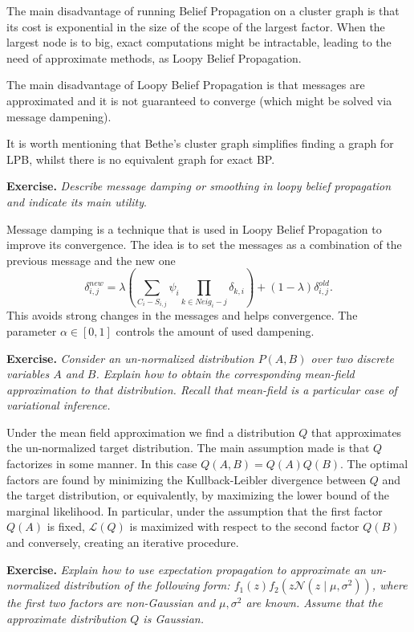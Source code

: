 \documentclass[11pt]{article}
\theoremstyle{definition}
\begin{document}
The main disadvantage of running Belief Propagation on a cluster graph is that its cost is exponential in the size of the scope of the largest factor. When the largest node is to big, exact computations might be intractable, leading to the need of approximate methods, as Loopy Belief Propagation.

The main disadvantage of Loopy Belief Propagation is that messages are approximated and it is not guaranteed to converge (which might be solved via message dampening).

It is worth mentioning that Bethe's cluster graph simplifies finding a graph for LPB, whilst there is no equivalent graph for exact BP.

\textbf{Exercise. }\emph{Describe message damping or smoothing in loopy belief propagation and indicate its main utility}.

Message damping is a technique that is used in Loopy Belief Propagation to improve its convergence. The idea is to set the messages as a combination of the previous message and the new one
\[
     \delta^{new}_{i,j} = \lambda\left( \sum_{C_i - S_{i,j}} \psi_i \prod_{k \in Neig_i - j} \delta_{k,i} \right) + (1-\lambda)\delta_{i,j}^{old}.
\]
This avoids strong changes in the messages and helps convergence. The parameter \( \alpha \in [0,1] \) controls the amount of used dampening. 


\textbf{Exercise. }\emph{ Consider an un-normalized distribution \( P(A, B) \)  over two discrete variables \( A \)  and \( B \). Explain how to obtain the corresponding mean-field approximation to that distribution. Recall that mean-field is a particular case of variational inference.}

Under the mean field approximation we find a distribution \( Q \) that approximates the un-normalized target distribution. The main assumption made is that \( Q \) factorizes in some manner. In this case \( Q(A, B) = Q(A)Q(B) \). The optimal factors are found by minimizing the Kullback-Leibler divergence between \( Q \) and the target distribution, or equivalently, by maximizing the lower bound of the marginal likelihood. In particular, under the assumption that the first factor \( Q(A) \)  is fixed, \( \mathcal{L}(Q) \) is maximized with respect to the second factor \( Q(B) \) and conversely, creating an iterative procedure.

\textbf{Exercise. }\emph{Explain how to use expectation propagation to approximate an un-normalized distribution of the following form: \( f_1(z)f_2(z\mathcal{N}(z \mid \mu, \sigma^2)) \), where the first two factors are non-Gaussian and \( \mu,\sigma^2 \) are known. Assume that the approximate distribution \( Q \) is Gaussian.}
\end{document}
